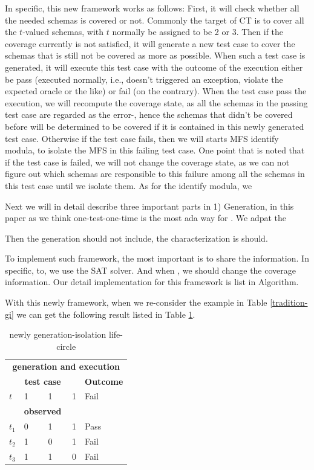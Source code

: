 \documentclass{sig-alternate}
\begin{document}
In specific, this new framework works as follows: First, it will check whether all the needed schemas is covered or not. Commonly the target of CT is to cover all the $t$-valued schemas, with $t$ normally be assigned to be 2 or 3. Then if the coverage currently is not satisfied, it will generate a new test case to cover the schemas that is still not be covered as more as possible. When such a test case is generated, it will execute this test case with the outcome of the execution either be pass (executed normally, i.e., doesn't triggered an exception, violate the expected oracle or the like) or fail (on the contrary). When the test case pass the execution, we will recompute the coverage state, as all the schemas in the passing test case are regarded as the error-, hence the schemas that didn't be covered before will be determined to be covered if it is contained in this newly generated test case. Otherwise if the test case fails, then we will starts MFS identify modula, to isolate the MFS in this failing test case. One point that is noted that if the test case is failed, we will not change the coverage state, as we can not figure out which schemas are responsible to this failure among all the schemas in this test case until we isolate them. As for the identify modula, we

Next we will in detail describe three important parts in
1) Generation, in this paper as we think one-test-one-time is the most ada way for . We adpat the 

Then the generation should not include, the characterization is should.

To implement such framework, the most important is to share the information. In specific, to, we use the SAT solver. And when , we should change the coverage information. Our detail implementation for this framework is list in Algorithm.

With this newly framework, when we re-consider the example in Table \ref{tradition-gi} we can get the following result listed in Table \ref{new-gi}.
\begin{table}[h]
\caption{newly generation-isolation life-circle}
\label{new-gi}
\center
\begin{tabular}{llllll}
\multicolumn{6}{c}{\bfseries generation and execution} \\
\multicolumn{5}{c}{\bfseries test case} & \bfseries Outcome \\
 $t$ & \multicolumn{4}{l}{1 \ \ \ \ 1 \ \ \ \  1 } & Fail \\
 \hline
\multicolumn{5}{c}{\bfseries observed} &  \\
$t_{1}$ &\multicolumn{4}{l}{0  \ \ \ \  1 \ \ \ \  1 }& Pass \\
$t_{2}$ &\multicolumn{4}{l}{1  \ \ \ \  0 \ \ \ \  1 } & Fail \\
$t_{3}$ &\multicolumn{4}{l}{1  \ \ \ \  1 \ \ \ \  0 } & Fail \\
\end{tabular}
\end{table}
\end{document}
